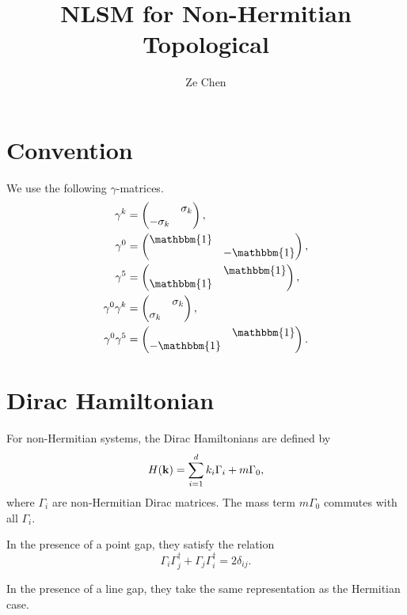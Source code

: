 \documentclass{article}
\title{NLSM for Non-Hermitian Topological}
\author{Ze Chen}
\begin{document}
\maketitle

\section{Convention}

We use the following $\gamma$-matrices.
\begin{align*}
    \gamma^k &= \begin{pmatrix}
        & \sigma_k \\ -\sigma_k
    \end{pmatrix},\\
    \gamma^0 &= \begin{pmatrix}
        \mathbbm{1} & \\ & -\mathbbm{1}
    \end{pmatrix},\\
    \gamma^5 &= \begin{pmatrix}
        & \mathbbm{1} \\ \mathbbm{1}
    \end{pmatrix}, \\
    \gamma^0 \gamma^k &= \begin{pmatrix}
        & \sigma_k \\ \sigma_k
    \end{pmatrix}, \\
    \gamma^0 \gamma^5 &= \begin{pmatrix}
        & \mathbbm{1} \\ -\mathbbm{1}
    \end{pmatrix}.
\end{align*}

\section{Dirac Hamiltonian}

For non-Hermitian systems, the Dirac Hamiltonians are defined by
\[ H(\vb{k}) = \sum_{i=1}^d k_i \Gamma_i + m \Gamma_0, \]
where $\Gamma_i$ are non-Hermitian Dirac matrices.
The mass term $m\Gamma_0$ commutes with all $\Gamma_i$.
\par
In the presence of a point gap, they satisfy the relation
\[ \Gamma_i \Gamma_j^\dagger + \Gamma_j \Gamma_i^\dagger = 2\delta_{ij}. \]
\par
In the presence of a line gap, they take the same representation as the Hermitian case.
\end{document}
